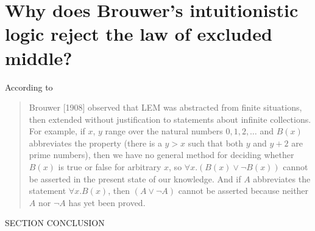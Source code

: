 \section{Why does Brouwer's intuitionistic logic reject the law of excluded middle?}
According to \cite{stanfordLogic} 
\begin{quote}
Brouwer [1908] observed that LEM was abstracted from finite situations, then extended without justification to statements about infinite collections. For example, if $x$, $y$ range over the natural numbers $0, 1, 2, \ldots$ and $B(x)$ abbreviates the property (there is a $y > x$ such that both $y$ and $y+2$ are prime numbers), then we have no general method for deciding whether $B(x)$ is true or false for arbitrary $x$, so $\forall x . (B(x) \vee \neg B(x))$ cannot be asserted in the present state of our knowledge. And if $A$ abbreviates the statement $\forall x . B(x)$, then $(A \vee \neg A)$ cannot be asserted because neither $A$ nor $\neg A$ has yet been proved.
\end{quote}

SECTION CONCLUSION
